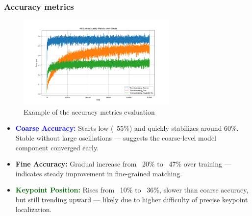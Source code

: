 \subsubsection{Accuracy metrics}
\begin{figure}[H]
    \centering
    \includegraphics[width=0.7\textwidth]{ressources/acuracy_2.png}
    \caption{Example of the accuracy metrics evaluation}
    \label{fig:accuracy_metrics_2}
\end{figure}
\begin{itemize}
    \item \textcolor{blue}{\textbf{Coarse Accuracy: }}Starts low (~55\%) and quickly stabilizes around 60\%. Stable without large oscillations — suggests the coarse-level model component converged early.
    \item \textcolor{myorange}{\textbf{Fine Accuracy: }}Gradual increase from ~20\% to ~47\% over training — indicates steady improvement in fine-grained matching.
    \item \textcolor{darkgreen}{\textbf{Keypoint Position: }}Rises from ~10\% to ~36\%, slower than coarse accuracy, but still trending upward — likely due to higher difficulty of precise keypoint localization.
\end{itemize}
